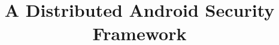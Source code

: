 \documentclass[conference]{IEEEtran}
\begin{document}
\title{A Distributed Android Security Framework}


\maketitle









\end{document}
